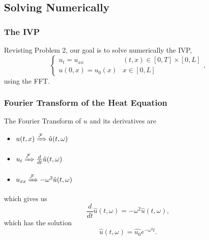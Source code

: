 \documentclass{beamer}
\begin{document}
\subsection{Solving Numerically}
\begin{frame}
	\frametitle{The IVP}
	Revisting Problem 2, our goal is to solve numerically the IVP,
			\[
		\begin{cases}
			u_t = u_{xx} & (t,x) \in [0,T] \times [0,L] \\
			u(0,x) = u_0(x) & x \in [0,L]
		\end{cases},
			\]
	using the FFT.
\end{frame}
\begin{frame}
	\frametitle{Fourier Transform of the Heat Equation}
	The Fourier Transform of $u$ and its derivatives are
	\begin{itemize}
		\item $u(t,x) \xRightarrow[]{\mathcal{F}} \hat{u}(t,\omega)$
		\item $u_t \xRightarrow[]{\mathcal{F}} \frac{d}{dt}\hat{u}(t,\omega)$
		\item $u_{xx} \xRightarrow[]{\mathcal{F}} -\omega^2\hat{u}(t,\omega)$
	\end{itemize}
	which gives us
	\begin{equation*}
		\frac{d}{dt}\hat{u}(t,\omega) = -\omega^2\hat{u}(t,\omega),
	\end{equation*}
	which has the solution
	\begin{equation*}
		\hat{u}(t,\omega) = \hat{u_0}e^{-\omega^2t}.
	\end{equation*}
\end{frame}
\end{document}
